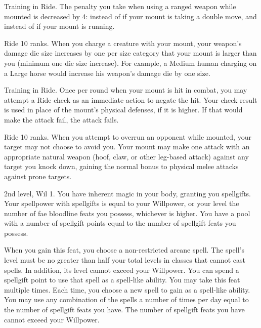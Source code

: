 \featpre Training in Ride.
\featben The penalty you take when using a ranged weapon while mounted is decreased by 4:  instead of  if your mount is taking a double move, and  instead of  if your mount is running.

\featpre Ride 10 ranks.
\featben When you charge a creature with your mount, your weapon's damage die size increases by one per size category that your mount is larger than you (minimum one die size increase).
For example, a Medium human charging on a Large horse would increase his weapon's damage die by one size.

\featpre Training in Ride.
\featben Once per round when your mount is hit in combat, you may attempt a Ride check as an immediate action to negate the hit.
Your check result is used in place of the mount's physical defenses, if it is higher.
If that would make the attack fail, the attack fails.

\featpre Ride 10 ranks.
\featben When you attempt to overrun an opponent while mounted, your target may not choose to avoid you.
Your mount may make one attack with an appropriate natural weapon (hoof, claw, or other leg-based attack) against any target you knock down, gaining the normal  bonus to physical melee attacks against prone targets.

\featpres 2nd level, Wil 1.
\featben You have inherent magic in your body, granting you spellgifts.
Your spellpower with spellgifts is equal to your Willpower, or your level \add the number of fae bloodline feats you possess, whichever is higher.
You have a pool with a number of spellgift points equal to the number of spellgift feats you possess.

When you gain this feat, you choose a non-restricted arcane spell.
The spell's level must be no greater than half your total levels in classes that cannot cast spells.
In addition, its level cannot exceed your Willpower.
You can spend a spellgift point to use that spell as a spell-like ability.
You may take this feat multiple times.
Each time, you choose a new spell to gain as a spell-like ability.
You may use any combination of the spells a number of times per day equal to the number of spellgift feats you have.
The number of spellgift feats you have cannot exceed your Willpower.

